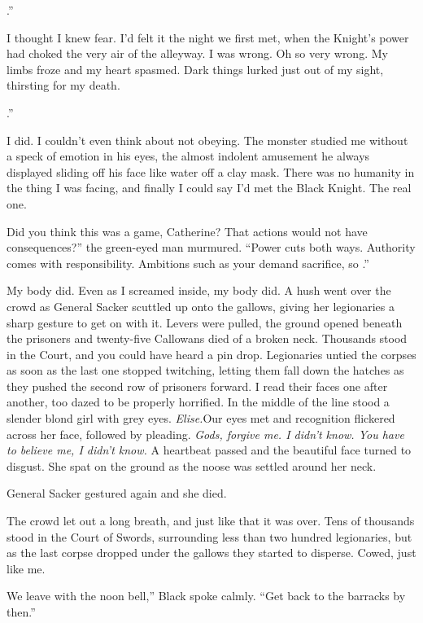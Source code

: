 \documentclass[12pt, openany]{book}
\begin{document}
.”

I thought I knew fear. I’d felt it the night we first met, when the Knight’s power had choked the very air of the alleyway. I was wrong. Oh so very wrong. My limbs froze and my heart spasmed. Dark things lurked just out of my sight, thirsting for my death.

.”

I did. I couldn’t even think about not obeying. The monster studied me without a speck of emotion in his eyes, the almost indolent amusement he always displayed sliding off his face like water off a clay mask. There was no humanity in the thing I was facing, and finally I could say I’d met the Black Knight. The real one.

Did you think this was a game, Catherine? That actions would not have consequences?” the green-eyed man murmured. “Power cuts both ways. Authority comes with responsibility. Ambitions such as your demand sacrifice, so  .”

My body did. Even as I screamed inside, my body did. A hush went over the crowd as General Sacker scuttled up onto the gallows, giving her legionaries a sharp gesture to get on with it. Levers were pulled, the ground opened beneath the prisoners and twenty-five Callowans died of a broken neck. Thousands stood in the Court, and you could have heard a pin drop. Legionaries untied the corpses as soon as the last one stopped twitching, letting them fall down the hatches as they pushed the second row of prisoners forward. I read their faces one after another, too dazed to be properly horrified. In the middle of the line stood a slender blond girl with grey eyes. \textit{Elise.}Our eyes met and recognition flickered across her face, followed by pleading. \textit{Gods, forgive me. I didn’t know. You have to believe me, I didn’t know.} A heartbeat passed and the beautiful face turned to disgust. She spat on the ground as the noose was settled around her neck.

General Sacker gestured again and she died.

The crowd let out a long breath, and just like that it was over. Tens of thousands stood in the Court of Swords, surrounding less than two hundred legionaries, but as the last corpse dropped under the gallows they started to disperse. Cowed, just like me.

We leave with the noon bell,” Black spoke calmly. “Get back to the barracks by then.”
\end{document}
